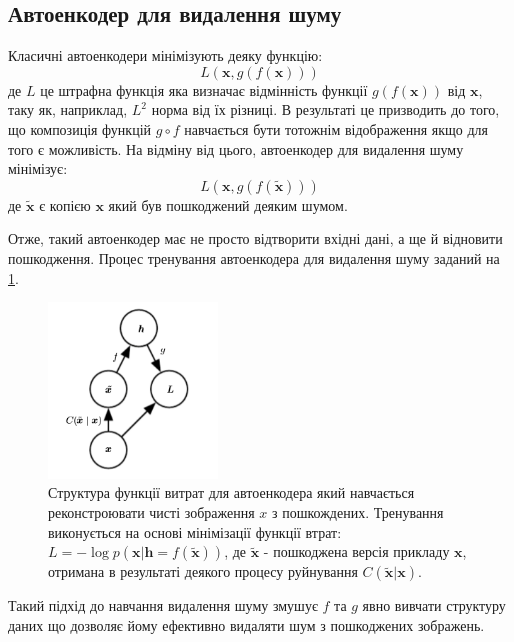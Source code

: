 \documentclass[14pt,a4paper]{extarticle}
\newcounter{e}
\numberwithin{equation}{section}
\numberwithin{figure}{section}
\begin{document}
	\newpage
	\subsection{Автоенкодер для видалення шуму}
	Класичні автоенкодери мінімізують деяку функцію:
	\begin{equation}
		L(\boldsymbol{x}, g(f(\boldsymbol{x})))
	\end{equation}
	де $L$ це штрафна функція яка визначає відмінність функції $g(f(\boldsymbol{x}))$ від $\boldsymbol{x}$, таку як, наприклад,  $L^{2}$ норма від їх різниці. В результаті це призводить до того, що композиція функцій $g \circ f$ навчається бути тотожнім відображення якщо для того є можливість. На відміну від цього, автоенкодер для видалення шуму мінімізує:
	\begin{equation}
		L(\boldsymbol{x}, g(f(\tilde{\boldsymbol{x}})))
	\end{equation}
	де $\tilde{\boldsymbol{x}}$ є копією $\boldsymbol{x}$ який був пошкоджений деяким шумом. 
		
	Отже, такий автоенкодер має не просто відтворити вхідні дані, а ще й відновити пошкодження. Процес тренування автоенкодера для видалення шуму заданий на \ref{fig:dae-graph}.
	\begin{figure}[h]
		\centering
		\includegraphics[width=0.4\textwidth]{resources/dae-graph.png}
		\caption{
			Структура функції витрат для автоенкодера який навчається реконстроювати чисті зображення $x$ з пошкождених. Тренування виконується на основі мінімізації функції втрат: $L = - \log p (\boldsymbol {x} | \boldsymbol {h} = f (\tilde {\boldsymbol {x}}))$, де $\tilde {\boldsymbol {x}}$ - пошкоджена версія прикладу $\boldsymbol {x}$, отримана в результаті деякого процесу руйнування $C (\tilde {\boldsymbol {x}} | \boldsymbol {x})$. \cite{Goodfellow-et-al-2016}
		}
		\label{fig:dae-graph}
	\end{figure}
		
	Такий підхід до навчання видалення шуму змушує $f$ та $g$ явно вивчати структуру даних що дозволяє йому ефективно видаляти шум з пошкоджених зображень.
\end{document}
